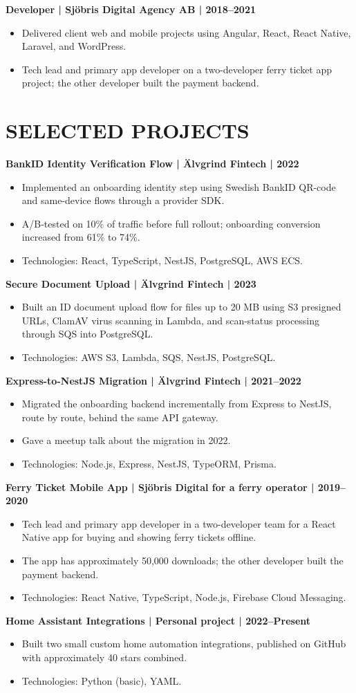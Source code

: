 \documentclass[11pt,a4paper]{article}
\begin{document}
\noindent\textbf{Developer | Sjöbris Digital Agency AB | 2018–2021}
\begin{itemize}
\item Delivered client web and mobile projects using Angular, React, React Native, Laravel, and WordPress.
\item Tech lead and primary app developer on a two-developer ferry ticket app project; the other developer built the payment backend.
\end{itemize}

\section*{SELECTED PROJECTS}
\noindent\textbf{BankID Identity Verification Flow | Älvgrind Fintech | 2022}
\begin{itemize}
\item Implemented an onboarding identity step using Swedish BankID QR-code and same-device flows through a provider SDK.
\item A/B-tested on 10\% of traffic before full rollout; onboarding conversion increased from 61\% to 74\%.
\item Technologies: React, TypeScript, NestJS, PostgreSQL, AWS ECS.
\end{itemize}

\noindent\textbf{Secure Document Upload | Älvgrind Fintech | 2023}
\begin{itemize}
\item Built an ID document upload flow for files up to 20 MB using S3 presigned URLs, ClamAV virus scanning in Lambda, and scan-status processing through SQS into PostgreSQL.
\item Technologies: AWS S3, Lambda, SQS, NestJS, PostgreSQL.
\end{itemize}

\noindent\textbf{Express-to-NestJS Migration | Älvgrind Fintech | 2021–2022}
\begin{itemize}
\item Migrated the onboarding backend incrementally from Express to NestJS, route by route, behind the same API gateway.
\item Gave a meetup talk about the migration in 2022.
\item Technologies: Node.js, Express, NestJS, TypeORM, Prisma.
\end{itemize}

\noindent\textbf{Ferry Ticket Mobile App | Sjöbris Digital for a ferry operator | 2019–2020}
\begin{itemize}
\item Tech lead and primary app developer in a two-developer team for a React Native app for buying and showing ferry tickets offline.
\item The app has approximately 50,000 downloads; the other developer built the payment backend.
\item Technologies: React Native, TypeScript, Node.js, Firebase Cloud Messaging.
\end{itemize}

\noindent\textbf{Home Assistant Integrations | Personal project | 2022–Present}
\begin{itemize}
\item Built two small custom home automation integrations, published on GitHub with approximately 40 stars combined.
\item Technologies: Python (basic), YAML.
\end{itemize}
\end{document}
